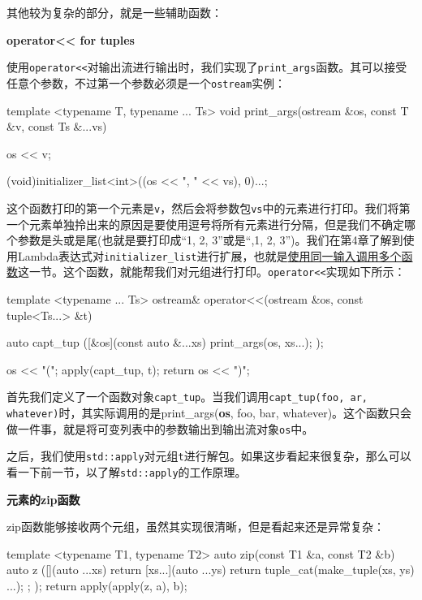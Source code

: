 其他较为复杂的部分，就是一些辅助函数：

\textbf{operator\textless{}\textless{} for tuples}

使用\texttt{operator<<}对输出流进行输出时，我们实现了\texttt{print\_args}函数。其可以接受任意个参数，不过第一个参数必须是一个\texttt{ostream}实例：

\begin{codebox}[cpp]
template <typename T, typename ... Ts>
void print_args(ostream &os, const T &v, const Ts &...vs)
{
    os << v;
    
    (void)initializer_list<int>{((os << ", " << vs), 0)...};
}
\end{codebox}

这个函数打印的第一个元素是\texttt{v}，然后会将参数包\texttt{vs}中的元素进行打印。我们将第一个元素单独拎出来的原因是要使用逗号将所有元素进行分隔，但是我们不确定哪个参数是头或是尾(也就是要打印成“1, 2, 3”或是“,1, 2, 3”)。我们在第4章了解到使用Lambda表达式对\texttt{initializer\_list}进行扩展，也就是\href{content/chapter4/chapter4-5-chinese.md}{使用同一输入调用多个函数}这一节。这个函数，就能帮我们对元组进行打印。\texttt{operator<<}实现如下所示：

\begin{codebox}[cpp]
template <typename ... Ts>
ostream& operator<<(ostream &os, const tuple<Ts...> &t)
{
    auto capt_tup ([&os](const auto &...xs) {
        print_args(os, xs...);
    });
    
    os << "(";
    apply(capt_tup, t);
    return os << ")";
}
\end{codebox}

首先我们定义了一个函数对象\texttt{capt\_tup}。当我们调用\texttt{capt\_tup(foo, ar, whatever)}时，其实际调用的是print\_args(\textbf{os}, foo, bar, whatever)。这个函数只会做一件事，就是将可变列表中的参数输出到输出流对象\texttt{os}中。

之后，我们使用\texttt{std::apply}对元组\texttt{t}进行解包。如果这步看起来很复杂，那么可以看一下前一节，以了解\texttt{std::apply}的工作原理。

\textbf{元素的zip函数}

zip函数能够接收两个元组，虽然其实现很清晰，但是看起来还是异常复杂：

\begin{codebox}[cpp]
template <typename T1, typename T2>
auto zip(const T1 &a, const T2 &b)
{
    auto z ([](auto ...xs) {
        return [xs...](auto ...ys) {
            return tuple_cat(make_tuple(xs, ys) ...);
        };
    });
    return apply(apply(z, a), b);
}
\end{codebox}

